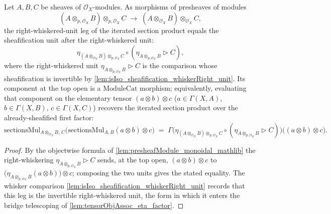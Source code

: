 \begin{lemma}\leanok
  \label{lem:sectionsMul_whiskerRight_unit}
  Let \(A, B, C\) be sheaves of \(\mathcal{O}_X\)-modules. As morphisms of
  presheaves of modules
  \[
    (A \otimes_{p,\mathcal{O}_X} B) \otimes_{p,\mathcal{O}_X} C
      \;\longrightarrow\;
    (A \otimes_{\mathcal{O}_X} B) \otimes_{\mathcal{O}_X} C,
  \]
  the right-whiskered-unit leg of the iterated section product equals the
  sheafification unit after the right-whiskered unit:
  \[
    \eta_{(A \otimes_{\mathcal{O}_X} B) \otimes_{p,\mathcal{O}_X} C}
      \circ (\eta_{A \otimes_{p,\mathcal{O}_X} B} \rhd C),
  \]
  where the right-whiskered unit \(\eta_{A \otimes_{p,\mathcal{O}_X} B} \rhd C\) is
  the comparison whose sheafification is invertible by
  \cref{lem:isIso_sheafification_whiskerRight_unit}. Its component at the top open is a \(\mathrm{ModuleCat}\)
  morphism; equivalently, evaluating that component on the elementary tensor
  \((a \otimes b) \otimes c\) (\(a \in \Gamma(X,A)\), \(b \in \Gamma(X,B)\),
  \(c \in \Gamma(X,C)\)) recovers the iterated section product over the
  already-sheafified first factor:
  \[
    \mathrm{sectionsMul}_{A \otimes_{\mathcal{O}_X} B,\, C}\bigl(
      \mathrm{sectionsMul}_{A,B}(a \otimes b) \otimes c\bigr)
    \;=\;
    \Gamma\bigl(
      \eta_{(A \otimes_{\mathcal{O}_X} B) \otimes_{p,\mathcal{O}_X} C}
        \circ (\eta_{A \otimes_{p,\mathcal{O}_X} B} \rhd C)
    \bigr)\bigl((a \otimes b) \otimes c\bigr).
  \]
\end{lemma}

\begin{proof}
  \leanok
  By the objectwise formula of \cref{lem:presheafModule_monoidal_mathlib} the
  right-whiskering \(\eta_{A \otimes_{p,\mathcal{O}_X} B} \rhd C\) sends, at the top
  open, \((a \otimes b) \otimes c\) to
  \(\bigl(\eta_{A \otimes_{p,\mathcal{O}_X} B}(a \otimes b)\bigr) \otimes c\);
  composing the two units gives the stated equality. The whisker comparison
  \cref{lem:isIso_sheafification_whiskerRight_unit} records that this leg is the
  invertible right-whiskered unit, the form in which it enters the bridge
  telescoping of \cref{lem:tensorObjAssoc_eta_factor}.
\end{proof}

